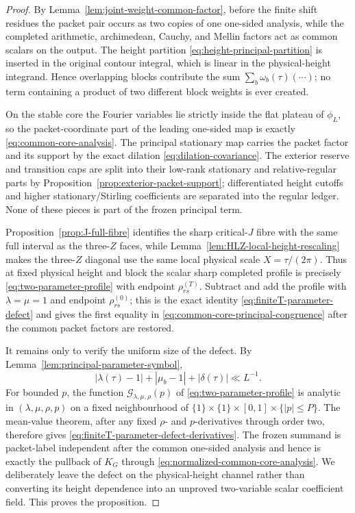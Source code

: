 \begin{proof}
By Lemma~\ref{lem:joint-weight-common-factor}, before the finite shift residues
the packet pair occurs as two copies of one one-sided analysis, while the
completed arithmetic, archimedean, Cauchy, and Mellin factors act as common
scalars on the output.  The height partition
\eqref{eq:height-principal-partition} is inserted in the original contour
integral, which is linear in the physical-height integrand.  Hence overlapping
blocks contribute the sum $\sum_b\omega_b(\tau)(\cdots)$; no term containing a
product of two different block weights is ever created.

On the stable core the Fourier variables lie strictly inside the flat plateau
of $\phi_L$, so the packet-coordinate part of the leading one-sided map is
exactly \eqref{eq:common-core-analysis}.  The principal stationary map carries
the packet factor and its support by the exact dilation
\eqref{eq:dilation-covariance}.  The exterior reserve and transition caps are
split into their low-rank stationary and relative-regular parts by
Proposition~\ref{prop:exterior-packet-support}; differentiated height cutoffs
and higher stationary/Stirling coefficients are separated into the regular
ledger. None of these pieces is part of the frozen principal term.

Proposition~\ref{prop:J-full-fibre} identifies the sharp critical-$J$ fibre
with the same full interval as the three-$Z$ faces, while
Lemma~\ref{lem:HLZ-local-height-rescaling} makes the three-$Z$ diagonal use the
same local physical scale $X=\tau/(2\pi)$.  Thus at fixed physical height and
block the scalar sharp completed profile is precisely
\eqref{eq:two-parameter-profile} with endpoint
$\rho_{rs}^{(T)}$.  Subtract and add the profile with
$\lambda=\mu=1$ and endpoint $\rho_{rs}^{(0)}$; this is the exact identity
\eqref{eq:finiteT-parameter-defect} and gives the first equality in
\eqref{eq:common-core-principal-congruence} after the common packet factors are
restored.

It remains only to verify the uniform size of the defect.  By
Lemma~\ref{lem:principal-parameter-symbol},
\[
|\lambda(\tau)-1|+|\mu_b-1|+|\delta(\tau)|\ll L^{-1}.
\]
For bounded $p$, the function
$\mathscr G_{\lambda,\mu,\rho}(p)$ of
\eqref{eq:two-parameter-profile} is analytic in $(\lambda,\mu,\rho,p)$ on a
fixed neighbourhood of
$\{1\}\times\{1\}\times[0,1]\times\{|p|\le P\}$.  The mean-value theorem,
after any fixed $\rho$- and $p$-derivatives through order two, therefore gives
\eqref{eq:finiteT-parameter-defect-derivatives}.  The frozen summand is
packet-label independent after the common one-sided analysis and hence is
exactly the pullback of $K_G$ through
\eqref{eq:normalized-common-core-analysis}.  We deliberately leave the defect
on the physical-height channel rather than converting its height dependence
into an unproved two-variable scalar coefficient field.  This proves the
proposition.
\end{proof}

